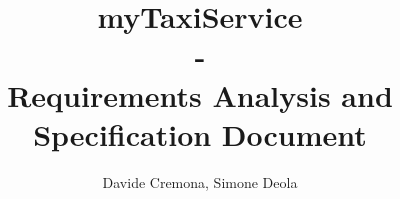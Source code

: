 \documentclass{report}
\begin{document}
	\title{\textbf{myTaxiService} \\ -  \\ \textbf{Requirements Analysis and Specification Document}}
	\author{Davide Cremona, Simone Deola}
	\maketitle

	\tableofcontents

	
	
	
	
	
\end{document}
